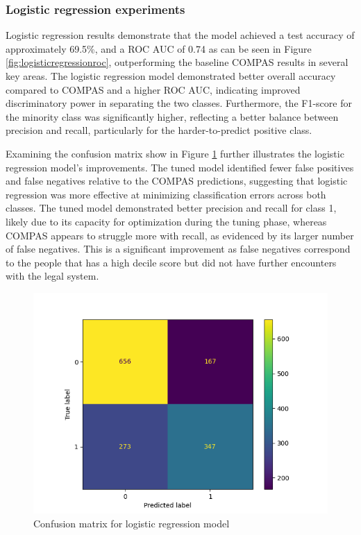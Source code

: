 	
	\bigskip
	\subsubsection{Logistic regression experiments}
	
	Logistic regression results demonstrate that the model achieved a test accuracy of approximately 69.5\%, and a ROC AUC of 0.74 as can be seen in Figure \ref{fig:logisticregressionroc}, outperforming the baseline COMPAS results in several key areas. The logistic regression model demonstrated better overall accuracy compared to COMPAS and a higher ROC AUC, indicating improved discriminatory power in separating the two classes. Furthermore, the F1-score for the minority class was significantly higher, reflecting a better balance between precision and recall, particularly for the harder-to-predict positive class.
	
	Examining the confusion matrix show in Figure \ref{fig:logisticregressioncm} further illustrates the logistic regression model's improvements. The tuned model identified fewer false positives and false negatives relative to the COMPAS predictions, suggesting that logistic regression was more effective at minimizing classification errors across both classes. The tuned model demonstrated better precision and recall for class 1, likely due to its capacity for optimization during the tuning phase, whereas COMPAS appears to struggle more with recall, as evidenced by its larger number of false negatives. This is a significant improvement as false negatives correspond to the people that has a high decile score but did not have further encounters with the legal system.
	
	\begin{figure}[H]
		\centering
		\includegraphics[width=0.7\linewidth]{img/logistic_regression_cm}
		\caption{Confusion matrix for logistic regression model}
		\label{fig:logisticregressioncm}
	\end{figure}
	

